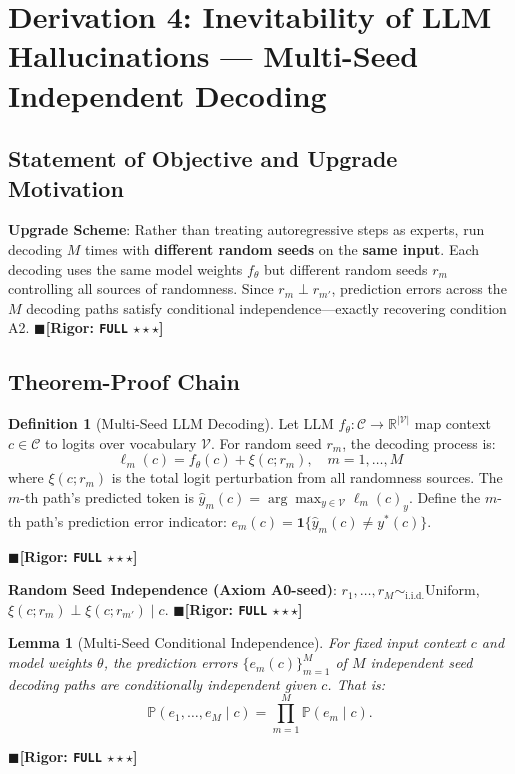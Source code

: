 \documentclass[12pt,a4paper]{article}
\newtheorem{lemma}[theorem]{Lemma}
\theoremstyle{definition}
\newtheorem{definition}{Definition}[section]
\theoremstyle{remark}
\newcommand{\rigorFull}{$\blacksquare$\;\textbf{[Rigor: \texttt{FULL} $\star\star\star$]}}
\begin{document}
\section{Derivation 4: Inevitability of LLM Hallucinations --- Multi-Seed Independent Decoding}
\label{sec:llm}

\subsection{Statement of Objective and Upgrade Motivation}
\textbf{Upgrade Scheme}: Rather than treating autoregressive steps as experts, run decoding $M$ times with \textbf{different random seeds} on the \textbf{same input}. Each decoding uses the same model weights $f_\theta$ but different random seeds $r_m$ controlling all sources of randomness. Since $r_m \perp r_{m'}$, prediction errors across the $M$ decoding paths satisfy conditional independence---exactly recovering condition A2.
\rigorFull

\subsection{Theorem-Proof Chain}

\begin{definition}[Multi-Seed LLM Decoding]
Let LLM $f_\theta: \mathcal{C} \to \mathbb{R}^{|\mathcal{V}|}$ map context $c \in \mathcal{C}$ to logits over vocabulary $\mathcal{V}$. For random seed $r_m$, the decoding process is:
\begin{equation}
\ell_m(c) = f_\theta(c) + \xi(c; r_m), \quad m = 1, \ldots, M
\end{equation}
where $\xi(c; r_m)$ is the total logit perturbation from all randomness sources. The $m$-th path's predicted token is $\hat{y}_m(c) = \arg\max_{y \in \mathcal{V}} \ell_m(c)_y$. Define the $m$-th path's prediction error indicator: $e_m(c) = \mathbf{1}\{\hat{y}_m(c) \neq y^*(c)\}$.
\end{definition}
\rigorFull

\textbf{Random Seed Independence (Axiom A0-seed)}: $r_1, \ldots, r_M \sim_{\text{i.i.d.}} \text{Uniform}$, $\xi(c; r_m) \perp \xi(c; r_{m'}) \mid c$.
\rigorFull

\begin{lemma}[Multi-Seed Conditional Independence]
\label{lem:5.1}
For fixed input context $c$ and model weights $\theta$, the prediction errors $\{e_m(c)\}_{m=1}^M$ of $M$ independent seed decoding paths are conditionally independent given $c$. That is:
\begin{equation}
\boxed{\mathbb{P}(e_1, \ldots, e_M \mid c) = \prod_{m=1}^{M} \mathbb{P}(e_m \mid c)}.
\end{equation}
\end{lemma}
\rigorFull
\end{document}
